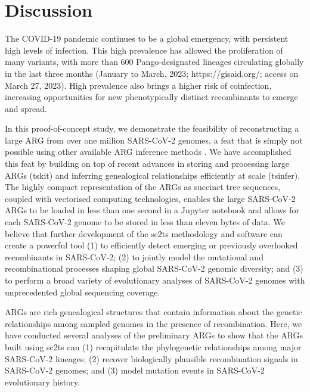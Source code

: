 \documentclass{article}
\begin{document}

\section{Discussion}
The COVID-19 pandemic continues to be a global emergency,
with persistent high levels of infection. This high prevalence has allowed the
proliferation of many variants, with more than 600 Pango-designated lineages
circulating globally in the last three months (January to March, 2023;
https://gisaid.org/; access on March 27, 2023). High prevalence also brings a
higher risk of coinfection, increasing opportunities for new phenotypically
distinct recombinants to emerge and spread.

In this proof-of-concept study, we demonstrate the feasibility of
reconstructing a large ARG from over one million SARS-CoV-2 genomes, a feat
that is simply not possible using other available ARG inference methods
\citep{Rasmussen2014-el,Ignatieva2021-rg, Speidel2019-yh}. We have accomplished
this feat by building on top of recent advances in storing and processing large
ARGs (tskit) and inferring genealogical relationships efficiently at scale
(tsinfer). The highly compact representation of the ARGs as succinct tree
sequences, coupled with vectorised computing technologies, enables the large
SARS-CoV-2 ARGs to be loaded in less than one second in a Jupyter notebook and
allows for each SARS-CoV-2 genome to be stored in less than eleven bytes of
data. We believe that further development of the sc2ts methodology and software
can create a powerful tool (1) to efficiently detect emerging or previously
overlooked recombinants in SARS-CoV-2; (2) to jointly model the mutational and
recombinational processes shaping global SARS-CoV-2 genomic diversity; and (3)
to perform a broad variety of evolutionary analyses of SARS-CoV-2 genomes with
unprecedented global sequencing coverage.

ARGs are rich genealogical structures that contain information about the
genetic relationships among sampled genomes in the presence of recombination.
Here, we have conducted several analyses of the preliminary ARGs to show that
the ARGs built using sc2ts can (1) recapitulate the phylogenetic relationships
among major SARS-CoV-2 lineages; (2) recover biologically plausible
recombination signals in SARS-CoV-2 genomes; and (3) model mutation events in
SARS-CoV-2 evolutionary history.
\end{document}

